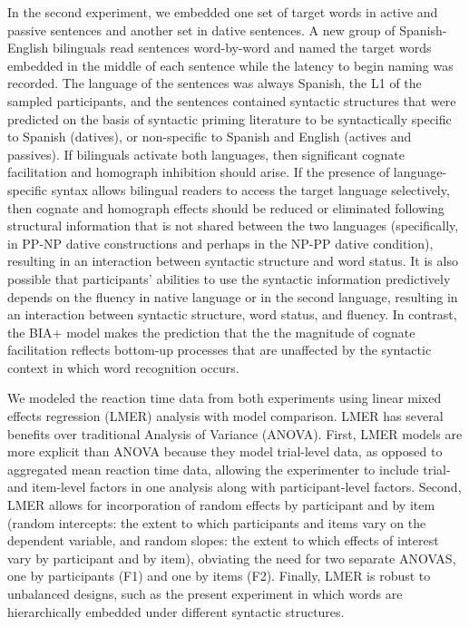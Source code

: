 In the second experiment, we embedded one set of target words in active and passive sentences and another set in dative sentences. A new group of Spanish-English bilinguals read sentences word-by-word and named the target words embedded in the middle of each sentence while the latency to begin naming was recorded. The language of the sentences was always Spanish, the L1 of the sampled participants, and the sentences contained syntactic structures that were predicted on the basis of syntactic priming literature to be syntactically specific to Spanish (datives), or non-specific to Spanish and English (actives and passives). If bilinguals activate both languages, then significant cognate facilitation and homograph inhibition should arise. If the presence of language-specific syntax allows bilingual readers to access the target language selectively, then cognate and homograph effects should be reduced or eliminated following structural information that is not shared between the two languages (specifically, in PP-NP dative constructions and perhaps in the NP-PP dative condition), resulting in an interaction between syntactic structure and word status. It is also possible that participants' abilities to use the syntactic information predictively depends on the fluency in native language or in the second language, resulting in an interaction between syntactic structure, word status, and fluency. In contrast, the BIA+ model makes the prediction that the the magnitude of cognate facilitation reflects bottom-up processes that are unaffected by the syntactic context in which word recognition occurs. 

We modeled the reaction time data from both experiments using linear mixed effects regression (LMER) analysis with model comparison. LMER has several benefits over traditional Analysis of Variance (ANOVA). First, LMER models are more explicit than ANOVA because they model trial-level data, as opposed to aggregated mean reaction time data, allowing the experimenter to include trial- and item-level factors in one analysis along with participant-level factors. Second, LMER allows for incorporation of random effects by participant and by item (random intercepts: the extent to which participants and items vary on the dependent variable, and random slopes: the extent to which effects of interest vary by participant and by item), obviating the need for two separate ANOVAS, one by participants (F1) and one by items (F2). Finally, LMER is robust to unbalanced designs, such as the present experiment in which words are hierarchically embedded under different syntactic structures. 


